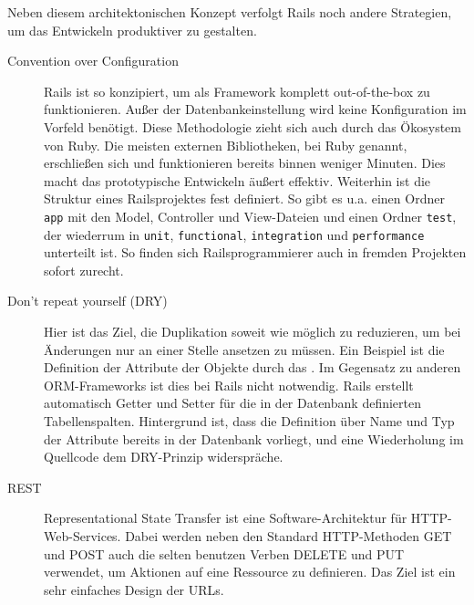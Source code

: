 Neben diesem architektonischen Konzept verfolgt Rails noch andere Strategien, um das Entwickeln produktiver zu gestalten.
\begin{description}
 \item[Convention over Configuration] Rails ist so konzipiert, um als Framework komplett out-of-the-box zu funktionieren. Außer der Datenbankeinstellung wird keine Konfiguration im Vorfeld benötigt. Diese Methodologie zieht sich auch durch das Ökosystem von Ruby. Die meisten externen Bibliotheken, bei Ruby  genannt, erschließen sich und funktionieren bereits binnen weniger Minuten. Dies macht das prototypische Entwickeln äußert effektiv. Weiterhin ist die Struktur eines Railsprojektes fest definiert. So gibt es u.a. einen Ordner \texttt{app} mit den Model, Controller und View-Dateien und einen Ordner \texttt{test}, der wiederrum in \texttt{unit}, \texttt{functional}, \texttt{integration} und \texttt{performance} unterteilt ist. So finden sich Railsprogrammierer auch in fremden Projekten sofort zurecht.
 \item[Don't repeat yourself (DRY)] Hier ist das Ziel, die Duplikation soweit wie möglich zu reduzieren, um bei Änderungen nur an einer Stelle ansetzen zu müssen. Ein Beispiel ist die Definition der Attribute der Objekte durch das . Im Gegensatz zu anderen ORM-Frameworks ist dies bei Rails nicht notwendig. Rails erstellt automatisch Getter und Setter für die in der Datenbank definierten Tabellenspalten. Hintergrund ist, dass die Definition über Name und Typ der Attribute bereits in der Datenbank vorliegt, und eine Wiederholung im Quellcode dem DRY-Prinzip widerspräche.
 \item[REST] Representational State Transfer ist eine Software-Architektur für HTTP-Web-Services. Dabei werden neben den Standard HTTP-Methoden GET und POST auch die selten benutzen Verben DELETE und PUT verwendet, um Aktionen auf eine Ressource zu definieren. Das Ziel ist ein sehr einfaches Design der URLs.


\end{description}

